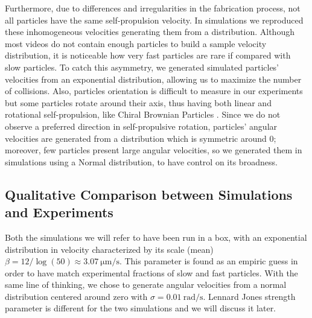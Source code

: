 \documentclass[../../master_thesis_np.tex]{subfiles}
\begin{document}
	Furthermore, due to differences and irregularities in the fabrication process, not all particles have the same self-propulsion velocity.
	In simulations we reproduced these inhomogeneous velocities generating them from a distribution.
	Although most videos do not contain enough particles to build a sample velocity distribution, it is noticeable how very fast particles are rare if compared with slow particles.
	To catch this asymmetry, we generated simulated particles' velocities from an exponential distribution, allowing us to maximize the number of collisions.
	Also, particles orientation is difficult to measure in our experiments but some particles rotate around their axis, thus having both linear and rotational self-propulsion, like  Chiral Brownian Particles \cite{callegari_numerical_2019, bechinger_active_2016}.
	Since we do not observe a preferred direction in self-propulsive rotation, particles' angular velocities are generated from a distribution which is symmetric around 0; moreover, few particles present large angular velocities, so we generated them in simulations using a Normal distribution, to have control on its broadness.
	
	\subsection{Qualitative Comparison between Simulations and Experiments}	
	
	Both the simulations we will refer to have been run in a  box, with an exponential distribution in velocity characterized by its scale (mean) $\beta = 12/\log(50) \approx \SI{3.07}{\um \per \second}$.
	This parameter is found as an empiric guess in order to have match experimental fractions of slow and fast particles.
	With the same line of thinking, we chose to generate angular velocities from a normal distribution centered around zero with $\sigma = \SI{0.01}{\radian\per\second}$.
	Lennard Jones strength parameter is different for the two simulations and we will discuss it later.
	
\end{document}

